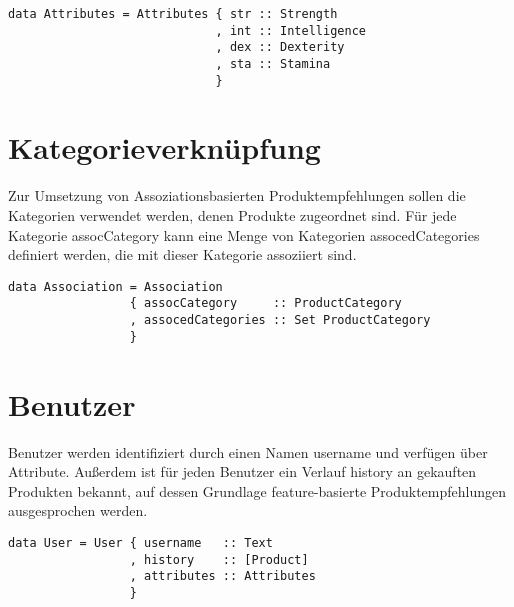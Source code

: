 \begin{lstlisting}[label=Attributes,caption=Struktur von \textsf{Attributes}]
data Attributes = Attributes { str :: Strength
                             , int :: Intelligence
                             , dex :: Dexterity
                             , sta :: Stamina
                             }
\end{lstlisting}

\section{Kategorieverknüpfung}
Zur Umsetzung von Assoziationsbasierten Produktempfehlungen sollen die Kategorien verwendet werden, denen Produkte zugeordnet sind. Für jede Kategorie \textsf{assocCategory} kann eine Menge von Kategorien \textsf{assocedCategories} definiert werden, die mit dieser Kategorie assoziiert sind.

\begin{lstlisting}[label=Association,caption=Struktur von \textsf{Association}]
data Association = Association
                 { assocCategory     :: ProductCategory
                 , assocedCategories :: Set ProductCategory
                 }
\end{lstlisting}


\section{Benutzer}
Benutzer werden identifiziert durch einen Namen \textsf{username} und verfügen über Attribute. Außerdem ist für jeden Benutzer ein Verlauf \textsf{history} an gekauften Produkten bekannt, auf dessen Grundlage feature-basierte Produktempfehlungen ausgesprochen werden.
\begin{lstlisting}[label=User,caption=Struktur vom \textsf{User}]
data User = User { username   :: Text
                 , history    :: [Product]
                 , attributes :: Attributes
                 }
\end{lstlisting}